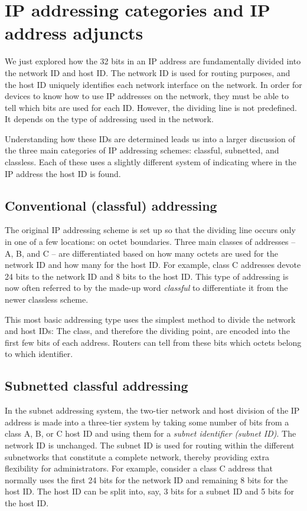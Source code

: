 \section{IP addressing categories and IP address adjuncts}

We just explored how the 32 bits in an IP address are fundamentally divided into
the network ID and host ID. The network ID is used for routing purposes,
and the host ID uniquely identifies each network interface on the
network. In order for devices to know how to use IP addresses on the
network, they must be able to tell which bits are used for each ID.
However, the dividing line is not predefined. It depends on the type of
addressing used in the network.

Understanding how these IDs are determined leads us into a larger
discussion of the three main categories of IP addressing schemes:
classful, subnetted, and classless. Each of these uses a slightly
different system of indicating where in the IP address the host ID is
found.



\subsection{Conventional (classful) addressing}

The original IP addressing scheme is set up so that the dividing line
occurs only in one of a few locations: on octet boundaries. Three main
classes of addresses -- A, B, and C -- are differentiated based on how
many octets are used for the network ID and how many for the host ID.
For example, class C addresses devote 24 bits to the network ID and 8
bits to the host ID. This type of addressing is now often referred to by
the made-up word {\emph{classful}} to differentiate it from the newer
classless scheme.

This most basic addressing type uses the simplest method to divide the
network and host IDs: The class, and therefore the dividing point, are
encoded into the first few bits of each address. Routers can tell from
these bits which octets belong to which identifier.




\subsection{Subnetted classful addressing}

In the subnet addressing system, the two-tier network and host division
of the IP address is made into a three-tier system by taking some number
of bits from a class A, B, or C host ID and using them for a
{\emph{subnet identifier (subnet ID)}}. The network ID is unchanged. The
subnet ID is used for routing within the different subnetworks that
constitute a complete network, thereby providing extra flexibility for
administrators. For example, consider a class C address that normally
uses the first 24 bits for the network ID and remaining 8 bits for the
host ID. The host ID can be split into, say, 3 bits for a subnet ID and
5 bits for the host ID.

